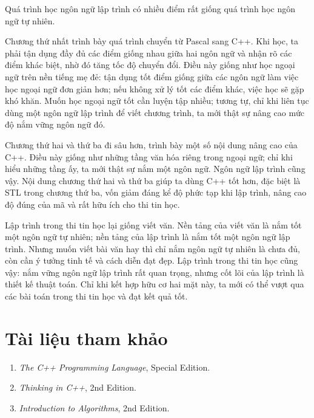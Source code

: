 \documentclass[11pt]{article}
\newcommand{\cpp}{C++}
\newcommand{\pascal}{Pascal}
\begin{document}
Quá trình học ngôn ngữ lập trình có nhiều điểm rất giống quá trình học ngôn
ngữ tự nhiên.

Chương thứ nhất trình bày quá trình chuyển từ \pascal{} sang \cpp{}. Khi học,
ta phải tận dụng đầy đủ các điểm giống nhau giữa hai ngôn ngữ và nhận rõ các
điểm khác biệt, nhờ đó tăng tốc độ chuyển đổi. Điều này giống như học ngoại
ngữ trên nền tiếng mẹ đẻ: tận dụng tốt điểm giống giữa các ngôn ngữ làm việc
học ngoại ngữ đơn giản hơn; nếu không xử lý tốt các điểm khác, việc học sẽ
gặp khó khăn. Muốn học ngoại ngữ tốt cần luyện tập nhiều; tương tự, chỉ khi
liên tục dùng một ngôn ngữ lập trình để viết chương trình, ta mới thật sự
nâng cao mức độ nắm vững ngôn ngữ đó.

Chương thứ hai và thứ ba đi sâu hơn, trình bày một số nội dung nâng cao của
\cpp{}. Điều này giống như những tầng văn hóa riêng trong ngoại ngữ; chỉ khi
hiểu những tầng ấy, ta mới thật sự nắm một ngôn ngữ. Ngôn ngữ lập trình cũng
vậy. Nội dung chương thứ hai và thứ ba giúp ta dùng \cpp{} tốt hơn, đặc biệt
là STL trong chương thứ ba, vốn giảm đáng kể độ phức tạp khi lập trình, nâng
cao độ đúng của mã và rất hữu ích cho thi tin học.

Lập trình trong thi tin học lại giống viết văn. Nền tảng của viết văn là nắm
tốt một ngôn ngữ tự nhiên; nền tảng của lập trình là nắm tốt một ngôn ngữ lập
trình. Nhưng muốn viết bài văn hay thì chỉ nắm ngôn ngữ tự nhiên là chưa đủ,
còn cần ý tưởng tinh tế và cách diễn đạt đẹp. Lập trình trong thi tin học
cũng vậy: nắm vững ngôn ngữ lập trình rất quan trọng, nhưng cốt lõi của lập
trình là thiết kế thuật toán. Chỉ khi kết hợp hữu cơ hai mặt này, ta mới có
thể vượt qua các bài toán trong thi tin học và đạt kết quả tốt.

\section*{Tài liệu tham khảo}

\begin{enumerate}
  \item \emph{The C++ Programming Language}, Special Edition.
  \item \emph{Thinking in C++}, 2nd Edition.
  \item \emph{Introduction to Algorithms}, 2nd Edition.
\end{enumerate}
\end{document}
